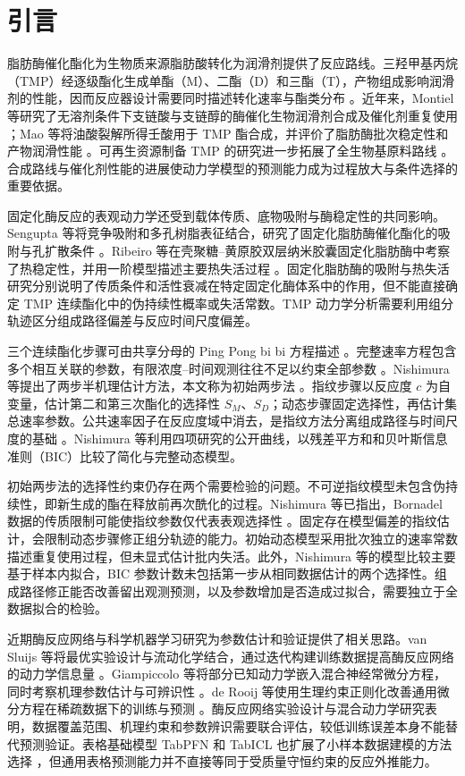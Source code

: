 \section{引言}
脂肪酶催化酯化为生物质来源脂肪酸转化为润滑剂提供了反应路线。三羟甲基丙烷（TMP）经逐级酯化生成单酯（M）、二酯（D）和三酯（T），产物组成影响润滑剂的性能，因而反应器设计需要同时描述转化速率与酯类分布 \cite{akerman2011,mao2024}。近年来，Montiel 等研究了无溶剂条件下支链酸与支链醇的酶催化生物润滑剂合成及催化剂重复使用 \cite{montiel2024}；Mao 等将油酸裂解所得壬酸用于 TMP 酯合成，并评价了脂肪酶批次稳定性和产物润滑性能 \cite{mao2024}。可再生资源制备 TMP 的研究进一步拓展了全生物基原料路线 \cite{sayed2025}。合成路线与催化剂性能的进展使动力学模型的预测能力成为过程放大与条件选择的重要依据。

固定化酶反应的表观动力学还受到载体传质、底物吸附与酶稳定性的共同影响。Sengupta 等将竞争吸附和多孔树脂表征结合，研究了固定化脂肪酶催化酯化的吸附与孔扩散条件 \cite{sengupta2026}。Ribeiro 等在壳聚糖--黄原胶双层纳米胶囊固定化脂肪酶中考察了热稳定性，并用一阶模型描述主要热失活过程 \cite{ribeiro2025}。固定化脂肪酶的吸附与热失活研究分别说明了传质条件和活性衰减在特定固定化酶体系中的作用，但不能直接确定 TMP 连续酯化中的伪持续性概率或失活常数。TMP 动力学分析需要利用组分轨迹区分组成路径偏差与反应时间尺度偏差。

三个连续酯化步骤可由共享分母的 Ping Pong bi bi 方程描述 \cite{cleland1963,cornishbowden2012,bornadel2013}。完整速率方程包含多个相互关联的参数，有限浓度--时间观测往往不足以约束全部参数 \cite{alhaque2012}。Nishimura 等提出了两步半机理估计方法，本文称为初始两步法 \cite{nishimura2026}。指纹步骤以反应度 $c$ 为自变量，估计第二和第三次酯化的选择性 $S_M$、$S_D$；动态步骤固定选择性，再估计集总速率参数。公共速率因子在反应度域中消去，是指纹方法分离组成路径与时间尺度的基础 \cite{mitchell2022a,mitchell2022b,mitchell2023}。Nishimura 等利用四项研究的公开曲线，以残差平方和和贝叶斯信息准则（BIC）比较了简化与完整动态模型。

初始两步法的选择性约束仍存在两个需要检验的问题。不可逆指纹模型未包含伪持续性，即新生成的酯在释放前再次酰化的过程。Nishimura 等已指出，Bornadel 数据的传质限制可能使指纹参数仅代表表观选择性 \cite{nishimura2026,mitchell2023}。固定存在模型偏差的指纹估计，会限制动态步骤修正组分轨迹的能力。初始动态模型采用批次独立的速率常数描述重复使用过程，但未显式估计批内失活。此外，Nishimura 等的模型比较主要基于样本内拟合，BIC 参数计数未包括第一步从相同数据估计的两个选择性。组成路径修正能否改善留出观测预测，以及参数增加是否造成过拟合，需要独立于全数据拟合的检验。

近期酶反应网络与科学机器学习研究为参数估计和验证提供了相关思路。van Sluijs 等将最优实验设计与流动化学结合，通过迭代构建训练数据提高酶反应网络的动力学信息量 \cite{vansluijs2024}。Giampiccolo 等将部分已知动力学嵌入混合神经常微分方程，同时考察机理参数估计与可辨识性 \cite{giampiccolo2024}。de Rooij 等使用生理约束正则化改善通用微分方程在稀疏数据下的训练与预测 \cite{derooij2025}。酶反应网络实验设计与混合动力学研究表明，数据覆盖范围、机理约束和参数辨识需要联合评估，较低训练误差本身不能替代预测验证。表格基础模型 TabPFN 和 TabICL 也扩展了小样本数据建模的方法选择 \cite{hollmann2025,qu2025tabicl}，但通用表格预测能力并不直接等同于受质量守恒约束的反应外推能力。

